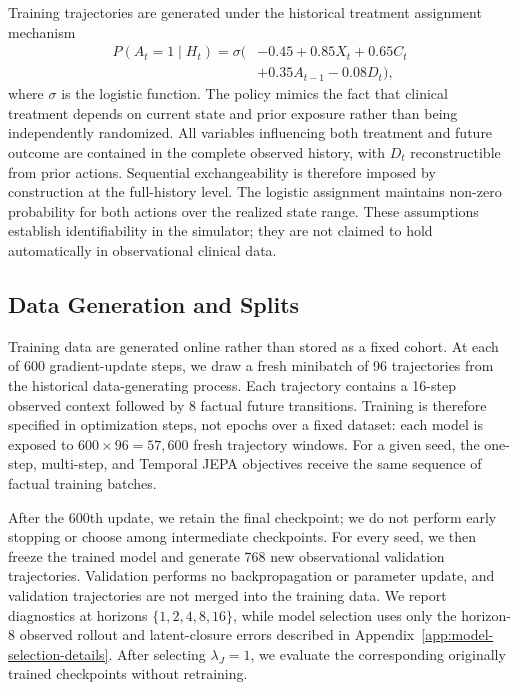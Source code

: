 Training trajectories are generated under the historical treatment
assignment mechanism
\begin{equation}
\begin{aligned}
    P(A_t=1\mid H_t)
    =\sigma(&-0.45+0.85X_t+0.65C_t\\
            &+0.35A_{t-1}-0.08D_t),
\end{aligned}
\label{eq:app-propensity}
\end{equation}
where $\sigma$ is the logistic function. The policy mimics the fact that
clinical treatment depends on current state and prior exposure rather
than being independently randomized. All variables influencing both
treatment and future outcome are contained in the complete observed
history, with $D_t$ reconstructible from prior actions. Sequential
exchangeability is therefore imposed by construction at the full-history
level. The logistic assignment maintains non-zero probability for both
actions over the realized state range. These assumptions establish
identifiability in the simulator; they are not claimed to hold
automatically in observational clinical data.

\subsection{Data Generation and Splits}
\label{app:data-generation}

Training data are generated online rather than stored as a fixed cohort.
At each of 600 gradient-update steps, we draw a fresh minibatch of 96
trajectories from the historical data-generating process. Each trajectory
contains a 16-step observed context followed by 8 factual future
transitions. Training is therefore specified in optimization steps, not
epochs over a fixed dataset: each model is exposed to $600\times96=57{,}600$
fresh trajectory windows. For a given seed, the one-step, multi-step, and
Temporal JEPA objectives receive the same sequence of factual training
batches.

After the 600th update, we retain the final checkpoint; we do not perform
early stopping or choose among intermediate checkpoints. For every seed,
we then freeze the trained model and generate 768 new observational
validation trajectories. Validation performs no backpropagation or
parameter update, and validation trajectories are not merged into the
training data. We report diagnostics at horizons
$\{1,2,4,8,16\}$, while model selection uses only the horizon-8 observed
rollout and latent-closure errors described in
Appendix~\ref{app:model-selection-details}. After selecting
$\lambda_J=1$, we evaluate the corresponding originally trained
checkpoints without retraining.

